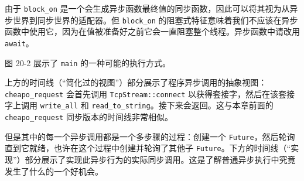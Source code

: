 由于 \texttt{block\_on} 是一个会生成异步函数最终值的同步函数，因此可以将其视为从异步世界到同步世界的适配器。但 \texttt{block\_on} 的阻塞式特征意味着我们不应该在异步函数中使用它，因为在值被准备好之前它会一直阻塞整个线程。异步函数中请改用 \texttt{await}。

图 20-2 展示了 \texttt{main} 的一种可能的执行方式。


上方的时间线（“简化过的视图”）部分展示了程序异步调用的抽象视图：\texttt{cheapo\_request} 会首先调用 \texttt{TcpStream::connect} 以获得套接字，然后在该套接字上调用 \texttt{write\_all} 和 \texttt{read\_to\_string}。接下来会返回。这与本章前面的 \texttt{cheapo\_request} 同步版本的时间线非常相似。

但是其中的每一个异步调用都是一个多步骤的过程：创建一个 \texttt{Future}，然后轮询直到它就绪，也许在这个过程中创建并轮询了其他子 \texttt{Future}。下方的时间线（“实现”）部分展示了实现此异步行为的实际同步调用。这是了解普通异步执行中究竟发生了什么的一个好机会。

